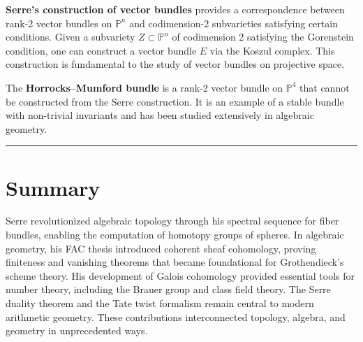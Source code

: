 \textbf{Serre's construction of vector bundles} provides a correspondence between rank-2 vector bundles on $\mathbb{P}^n$ and codimension-2 subvarieties satisfying certain conditions. Given a subvariety $Z \subset \mathbb{P}^n$ of codimension 2 satisfying the Gorenstein condition, one can construct a vector bundle $E$ via the Koszul complex. This construction is fundamental to the study of vector bundles on projective space.

The \textbf{Horrocks--Mumford bundle} is a rank-2 vector bundle on $\mathbb{P}^4$ that cannot be constructed from the Serre construction. It is an example of a stable bundle with non-trivial invariants and has been studied extensively in algebraic geometry.

\begin{center}\rule{0.5\linewidth}{0.5pt}\end{center}

\section*{Summary}

Serre revolutionized algebraic topology through his spectral sequence for fiber bundles, enabling the computation of homotopy groups of spheres. In algebraic geometry, his FAC thesis introduced coherent sheaf cohomology, proving finiteness and vanishing theorems that became foundational for Grothendieck's scheme theory. His development of Galois cohomology provided essential tools for number theory, including the Brauer group and class field theory. The Serre duality theorem and the Tate twist formalism remain central to modern arithmetic geometry. These contributions interconnected topology, algebra, and geometry in unprecedented ways.
